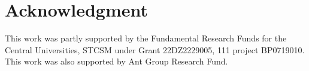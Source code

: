 \section{Acknowledgment}

This work was partly supported by the Fundamental Research Funds for the Central Universities, STCSM under Grant 22DZ2229005, 111 project BP0719010. This work was also supported by Ant Group Research Fund.